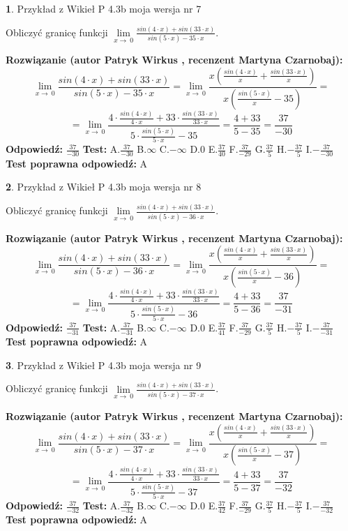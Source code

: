 \documentclass[12pt, a4paper]{article}
\theoremstyle{definition} %
\newtheorem{zad}{}
\newcommand{\zadStart}[1]{\begin{zad}#1\newline}
\newcommand{\zadStop}{\end{zad}}
\newcommand{\rozwStart}[2]{\noindent \textbf{Rozwiązanie (autor #1 , recenzent #2): }\newline}
\newcommand{\rozwStop}{\newline}
\newcommand{\odpStart}{\noindent \textbf{Odpowiedź:}\newline}
\newcommand{\odpStop}{\newline}
\newcommand{\testStart}{\noindent \textbf{Test:}\newline}
\newcommand{\testStop}{\newline}
\newcommand{\kluczStart}{\noindent \textbf{Test poprawna odpowiedź:}\newline}
\newcommand{\kluczStop}{\newline}
\begin{document}
\zadStart{Przykład z Wikieł P 4.3b moja wersja nr 7}


Obliczyć granicę funkcji $\lim\limits_{x\to\ 0}\frac{sin(4 \cdot x)+sin(33 \cdot x)}{sin(5 \cdot x)-35 \cdot x}$.
\zadStop
\rozwStart{Patryk Wirkus}{Martyna Czarnobaj}
$$\lim\limits_{x\to\ 0}\frac{sin(4 \cdot x)+sin(33 \cdot x)}{sin(5 \cdot x)-35 \cdot x}=\lim\limits_{x\to\ 0}\frac{x(\frac{sin(4 \cdot x)}{x}+\frac{sin(33 \cdot x)}{x})}{x(\frac{sin(5 \cdot x)}{x}-35)}=$$
$$=\lim\limits_{x\to\ 0}\frac{4 \cdot \frac{sin(4 \cdot x)}{4 \cdot x}+33 \cdot \frac{sin(33 \cdot x)}{33 \cdot x}}{5 \cdot \frac{sin(5 \cdot x)}{5 \cdot x}-35}=\frac{4+33}{5-35} = \frac{37}{-30}$$
\rozwStop
\odpStart
$\frac{37}{-30}$
\odpStop
\testStart
A.$\frac{37}{-30}$
B.$\infty$
C.$-\infty$
D.$0$
E.$\frac{37}{40}$
F.$\frac{37}{-29}$
G.$\frac{37}{5}$
H.$-\frac{37}{5}$
I.$-\frac{37}{-30}$
\testStop
\kluczStart
A
\kluczStop



\zadStart{Przykład z Wikieł P 4.3b moja wersja nr 8}


Obliczyć granicę funkcji $\lim\limits_{x\to\ 0}\frac{sin(4 \cdot x)+sin(33 \cdot x)}{sin(5 \cdot x)-36 \cdot x}$.
\zadStop
\rozwStart{Patryk Wirkus}{Martyna Czarnobaj}
$$\lim\limits_{x\to\ 0}\frac{sin(4 \cdot x)+sin(33 \cdot x)}{sin(5 \cdot x)-36 \cdot x}=\lim\limits_{x\to\ 0}\frac{x(\frac{sin(4 \cdot x)}{x}+\frac{sin(33 \cdot x)}{x})}{x(\frac{sin(5 \cdot x)}{x}-36)}=$$
$$=\lim\limits_{x\to\ 0}\frac{4 \cdot \frac{sin(4 \cdot x)}{4 \cdot x}+33 \cdot \frac{sin(33 \cdot x)}{33 \cdot x}}{5 \cdot \frac{sin(5 \cdot x)}{5 \cdot x}-36}=\frac{4+33}{5-36} = \frac{37}{-31}$$
\rozwStop
\odpStart
$\frac{37}{-31}$
\odpStop
\testStart
A.$\frac{37}{-31}$
B.$\infty$
C.$-\infty$
D.$0$
E.$\frac{37}{41}$
F.$\frac{37}{-29}$
G.$\frac{37}{5}$
H.$-\frac{37}{5}$
I.$-\frac{37}{-31}$
\testStop
\kluczStart
A
\kluczStop



\zadStart{Przykład z Wikieł P 4.3b moja wersja nr 9}


Obliczyć granicę funkcji $\lim\limits_{x\to\ 0}\frac{sin(4 \cdot x)+sin(33 \cdot x)}{sin(5 \cdot x)-37 \cdot x}$.
\zadStop
\rozwStart{Patryk Wirkus}{Martyna Czarnobaj}
$$\lim\limits_{x\to\ 0}\frac{sin(4 \cdot x)+sin(33 \cdot x)}{sin(5 \cdot x)-37 \cdot x}=\lim\limits_{x\to\ 0}\frac{x(\frac{sin(4 \cdot x)}{x}+\frac{sin(33 \cdot x)}{x})}{x(\frac{sin(5 \cdot x)}{x}-37)}=$$
$$=\lim\limits_{x\to\ 0}\frac{4 \cdot \frac{sin(4 \cdot x)}{4 \cdot x}+33 \cdot \frac{sin(33 \cdot x)}{33 \cdot x}}{5 \cdot \frac{sin(5 \cdot x)}{5 \cdot x}-37}=\frac{4+33}{5-37} = \frac{37}{-32}$$
\rozwStop
\odpStart
$\frac{37}{-32}$
\odpStop
\testStart
A.$\frac{37}{-32}$
B.$\infty$
C.$-\infty$
D.$0$
E.$\frac{37}{42}$
F.$\frac{37}{-29}$
G.$\frac{37}{5}$
H.$-\frac{37}{5}$
I.$-\frac{37}{-32}$
\testStop
\kluczStart
A
\kluczStop
\end{document}
